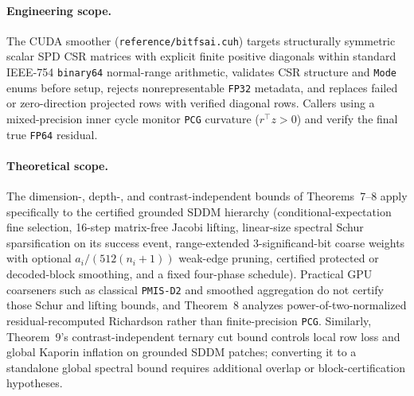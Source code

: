 \documentclass[10pt]{article}
\begin{document}
\paragraph{Engineering scope.} The CUDA smoother (\texttt{reference/bitfsai.cuh}) targets structurally symmetric scalar SPD CSR matrices with explicit finite positive diagonals within standard IEEE-754 \texttt{binary64} normal-range arithmetic, validates CSR structure and \texttt{Mode} enums before setup, rejects nonrepresentable \texttt{FP32} metadata, and replaces failed or zero-direction projected rows with verified diagonal rows. Callers using a mixed-precision inner cycle monitor \texttt{PCG} curvature ($r^\top z > 0$) and verify the final true \texttt{FP64} residual.

\paragraph{Theoretical scope.} The dimension-, depth-, and contrast-independent bounds of Theorems~7--8 apply specifically to the certified grounded SDDM hierarchy (conditional-expectation fine selection, 16-step matrix-free Jacobi lifting, linear-size spectral Schur sparsification on its success event, range-extended 3-significand-bit coarse weights with optional $a_i/(512(n_i+1))$ weak-edge pruning, certified protected or decoded-block smoothing, and a fixed four-phase schedule). Practical GPU coarseners such as classical \texttt{PMIS-D2} and smoothed aggregation do not certify those Schur and lifting bounds, and Theorem~8 analyzes power-of-two-normalized residual-recomputed Richardson rather than finite-precision \texttt{PCG}. Similarly, Theorem~9's contrast-independent ternary cut bound controls local row loss and global Kaporin inflation on grounded SDDM patches; converting it to a standalone global spectral bound requires additional overlap or block-certification hypotheses.
\end{document}
